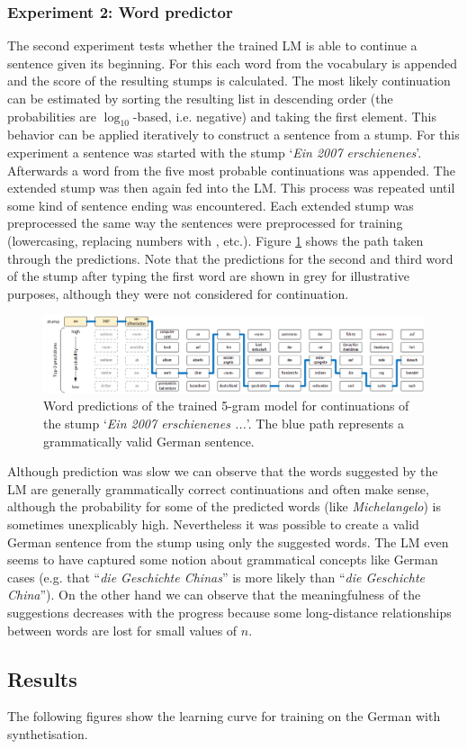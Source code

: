 \subsubsection{Experiment 2: Word predictor}

The second experiment tests whether the trained \ac{LM} is able to continue a sentence given its beginning. For this each word from the vocabulary is appended and the score of the resulting stumps is calculated. The most likely continuation can be estimated by sorting the resulting list in descending order (the probabilities are $\log_10$-based, i.e. negative) and taking the first element. This behavior can be applied iteratively to construct a sentence from a stump. For this experiment a sentence was started with the stump \foreignquote*{french}{\textit{Ein 2007 erschienenes}}. Afterwards a word from the five most probable continuations was appended. The extended stump was then again fed into the \ac{LM}. This process was repeated until some kind of sentence ending was encountered. Each extended stump was preprocessed the same way the sentences were preprocessed for training (lowercasing, replacing numbers with , etc.). Figure \ref{word_predictor} shows the path taken through the predictions. Note that the predictions for the second and third word of the stump after typing the first word are shown in grey for illustrative purposes, although they were not considered for continuation.

\begin{figure}[h!]
	\includegraphics[width=\linewidth]{./img/word_predictor.png}
	\caption{Word predictions of the trained 5-gram model for continuations of the stump \foreignquote*{french}{\textit{Ein 2007 erschienenes ...}}. The blue path represents a grammatically valid German sentence.}
	\label{word_predictor}
\end{figure}

Although prediction was slow we can observe that the words suggested by the \ac{LM} are generally grammatically correct continuations and often make sense, although the probability for some of the predicted words (like \textit{Michelangelo}) is sometimes unexplicably high. Nevertheless it was possible to create a valid German sentence from the stump using only the suggested words. The \ac{LM} even seems to have captured some notion about grammatical concepts like German cases (e.g. that \foreignquote{french}{\textit{die Geschichte Chinas}} is more likely than \foreignquote{french}{\textit{die Geschichte China}}). On the other hand we can observe that the meaningfulness of the suggestions decreases with the progress because some long-distance relationships between words are lost for small values of $n$.

\subsection{Results}

The following figures show the learning curve for training on the German with synthetisation.